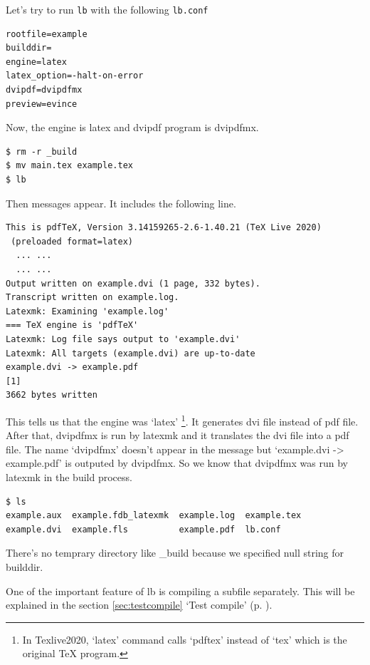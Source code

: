 Let's try to run \verb|lb| with the following \verb|lb.conf|
\begin{verbatim}
rootfile=example
builddir=
engine=latex
latex_option=-halt-on-error
dvipdf=dvipdfmx
preview=evince
\end{verbatim}
Now, the engine is latex and dvipdf program is dvipdfmx.
\begin{verbatim}
$ rm -r _build
$ mv main.tex example.tex
$ lb
\end{verbatim}
Then messages appear.
It includes the following line.
\begin{verbatim}
This is pdfTeX, Version 3.14159265-2.6-1.40.21 (TeX Live 2020)
 (preloaded format=latex)
  ... ...
  ... ...
Output written on example.dvi (1 page, 332 bytes).
Transcript written on example.log.
Latexmk: Examining 'example.log'
=== TeX engine is 'pdfTeX'
Latexmk: Log file says output to 'example.dvi'
Latexmk: All targets (example.dvi) are up-to-date
example.dvi -> example.pdf
[1]
3662 bytes written
\end{verbatim}
This tells us that the engine was `latex'%
\footnote{
In Texlive2020, `latex' command calls `pdftex' instead of `tex' which is the original TeX program.
}.
It generates dvi file instead of pdf file.
After that, dvipdfmx is run by latexmk and it translates the dvi file into a pdf file.
The name `dvipdfmx' doesn't appear in the message but `example.dvi -{\textgreater} example.pdf' is outputed by dvipdfmx.
So we know that dvipdfmx was run by latexmk in the build process.
\begin{verbatim}
$ ls
example.aux  example.fdb_latexmk  example.log  example.tex
example.dvi  example.fls          example.pdf  lb.conf
\end{verbatim}
There's no temprary directory like \_build because we specified null string for builddir.

One of the important feature of lb is compiling a subfile separately.
This will be explained in the section  \ref{sec:testcompile} `Test compile' (p. \pageref{sec:testcompile}).
